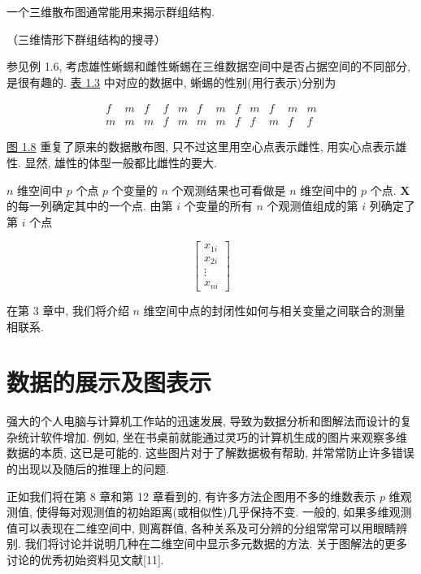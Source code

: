 一个三维散布图通常能用来揭示群组结构.

 （三维情形下群组结构的搜寻）

参见例 1.6, 考虑雄性蜥蜴和雌性蜥蜴在三维数据空间中是否占据空间的不同部分, 是很有趣的. \hyperref[tab:1.3]{表 1.3} 中对应的数据中, 蜥蜴的性别(用行表示)分别为

\[
\begin{array}{cccccccccccc}
f & m & f & f & m & f & m & f & m & f & m & m \\
m & m & m & f & m & m & m & f & f & m & f & f
\end{array}
\]

\hyperref[fig:1.8]{图 1.8} 重复了原来的数据散布图, 只不过这里用空心点表示雌性, 用实心点表示雄性. 显然, 雄性的体型一般都比雌性的要大.

\begin{mvfigure}
\label{fig:1.8}
\end{mvfigure}

$n$ 维空间中 $p$ 个点 \quad $p$ 个变量的 $n$ 个观测结果也可看做是 $n$ 维空间中的 $p$ 个点. $\bm{X}$ 的每一列确定其中的一个点. 由第 $i$ 个变量的所有 $n$ 个观测值组成的第 $i$ 列确定了第 $i$ 个点

\[
\begin{bmatrix}
x_{1i} \\
x_{2i} \\
\vdots \\
x_{ni}
\end{bmatrix}
\]

在第 3 章中, 我们将介绍 $n$ 维空间中点的封闭性如何与相关变量之间联合的测量相联系.

\section{数据的展示及图表示}  %
\label{sec:1.4}

强大的个人电脑与计算机工作站的迅速发展, 导致为数据分析和图解法而设计的复杂统计软件增加. 例如, 坐在书桌前就能通过灵巧的计算机生成的图片来观察多维数据的本质, 这已是可能的. 这些图片对于了解数据极有帮助, 并常常防止许多错误的出现以及随后的推理上的问题.

正如我们将在第 8 章和第 12 章看到的, 有许多方法企图用不多的维数表示 $p$ 维观测值, 使得每对观测值的初始距离(或相似性)几乎保持不变. 一般的, 如果多维观测值可以表现在二维空间中, 则离群值, 各种关系及可分辨的分组常常可以用眼睛辨别. 我们将讨论并说明几种在二维空间中显示多元数据的方法. 关于图解法的更多讨论的优秀初始资料见文献[11].
